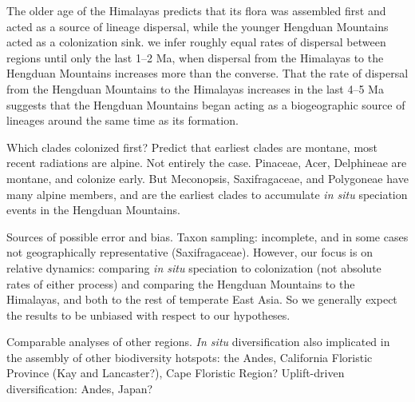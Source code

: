 The older age of the Himalayas predicts that its flora was assembled first and acted as a source of lineage dispersal, while the younger Hengduan Mountains acted as a colonization sink. %
we infer roughly equal rates of dispersal between regions until only the last 1--2 Ma, when dispersal from the Himalayas to the Hengduan Mountains increases more than the converse. That the rate of dispersal from the Hengduan Mountains to the Himalayas increases in the last 4--5 Ma suggests that the Hengduan Mountains began acting as a biogeographic source of lineages around the same time as its formation. %

Which clades colonized first? Predict that earliest clades are montane, most recent radiations are alpine. Not entirely the case. Pinaceae, Acer, Delphineae are montane, and colonize early. But Meconopsis, Saxifragaceae, and Polygoneae have many alpine members, and are the earliest clades to accumulate \textit{in situ} speciation events in the Hengduan Mountains.%



Sources of possible error and bias. Taxon sampling: incomplete, and in some cases not geographically representative (Saxifragaceae). However, our focus is on relative dynamics: comparing \textit{in situ} speciation to colonization (not absolute rates of either process) and comparing the Hengduan Mountains to the Himalayas, and both to the rest of temperate East Asia. So we generally expect the results to be unbiased with respect to our hypotheses.



Comparable analyses of other regions. \textit{In situ} diversification also implicated in the assembly of other biodiversity hotspots: the Andes, California Floristic Province (Kay and Lancaster?), Cape Floristic Region? Uplift-driven diversification: Andes, Japan?
